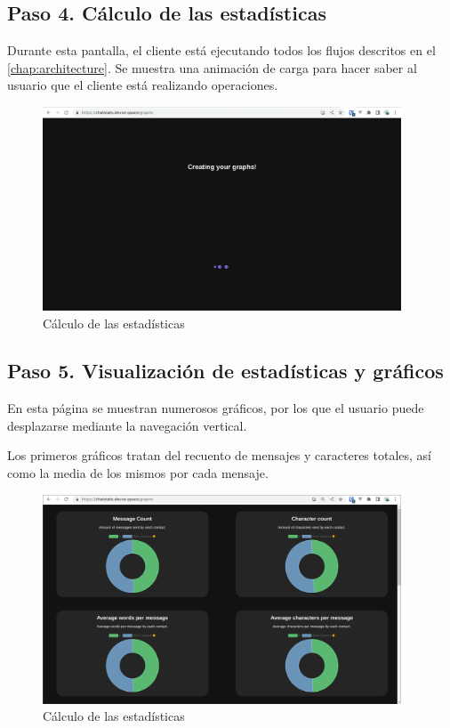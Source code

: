 \subsection{Paso 4. Cálculo de las estadísticas}

Durante esta pantalla, el cliente está ejecutando todos los flujos descritos en el \autoref{chap:architecture}. Se muestra una animación de carga para hacer saber al usuario que el cliente está realizando operaciones.

\begin{figure}[H]
	\centering
	\includegraphics[width=0.95\textwidth]{img/study_case/step4.png}
	\caption{Cálculo de las estadísticas}
	\label{fig:chap5:step_4}
\end{figure}


\subsection{Paso 5. Visualización de estadísticas y gráficos}

En esta página se muestran numerosos gráficos, por los que el usuario puede desplazarse mediante la navegación vertical.

Los primeros gráficos tratan del recuento de mensajes y caracteres totales, así como la media de los mismos por cada mensaje.

\begin{figure}[H]
	\centering
	\includegraphics[width=0.95\textwidth]{img/study_case/step5_1.png}
	\caption{Cálculo de las estadísticas}
	\label{fig:chap5:step_5_1}
\end{figure}


